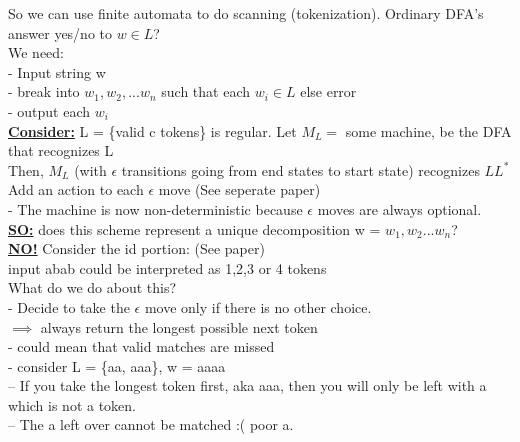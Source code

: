 \documentclass[12pt]{article}
\newcommand{\myt}[1]{\textbf{\underline{#1}}}
\begin{document}
	So we can use finite automata to do scanning (tokenization). Ordinary DFA's answer yes/no to $w \in L$?\\
	We need: \\
	- Input string w\\
	- break into $w_1, w_2, ... w_n$ such that each $w_i \in L$ else error\\
	- output each $w_i$\\
	
	\myt{Consider:} L = \{valid c tokens\} is regular.
	Let $M_L = $ some machine, be the DFA that recognizes L\\
	Then, $M_L$ (with $\epsilon$ transitions going from end states to start state) recognizes $LL^*$\\
	
	Add an action to each $\epsilon$ move (See seperate paper)\\
	- The machine is now non-deterministic because $\epsilon$ moves are always optional.\\
	
	\myt{SO:} does this scheme represent a unique decomposition w = $w_1, w_2 ... w_n$?\\
	
	\myt{NO!} Consider the id portion: (See paper)\\
	input abab could be interpreted as 1,2,3 or 4 tokens\\
	
	What do we do about this?\\
	- Decide to take the $\epsilon$ move only if there is no other choice.\\
	$\implies$ always return the longest possible next token\\
	- could mean that valid matches are missed \\
	- consider L = \{aa, aaa\}, w = aaaa\\
	-- If you take the longest token first, aka aaa, then you will only be left with a which is not a token.\\
	-- The a left over cannot be matched :( poor a.\\
	
	
	
	
	
	
	
\end{document}
